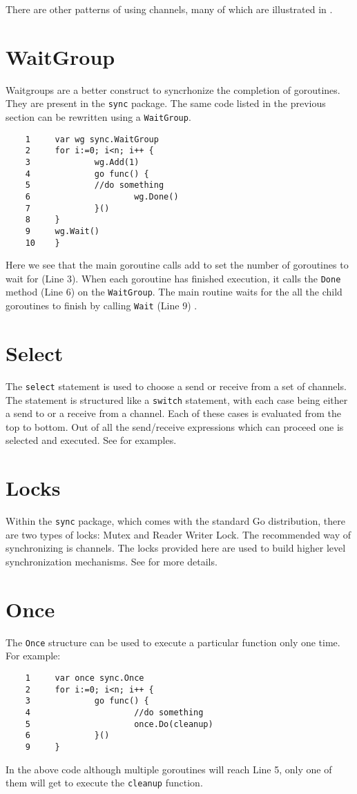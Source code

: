 \documentclass[8pt, twocolumn]{article}
\begin{document}
There are other patterns of using channels, many of
which are illustrated in \cite{effectivego}.
\section{WaitGroup}
Waitgroups are a better construct to syncrhonize the completion of
goroutines. They are present in the \verb=sync= package. The same code
listed in the previous section can be rewritten using a
\verb=WaitGroup=. 
\begin{verbatim}
    1     var wg sync.WaitGroup
    2     for i:=0; i<n; i++ {
    3             wg.Add(1)
    4             go func() {
    5             //do something
    6                     wg.Done()
    7             }()
    8     }
    9     wg.Wait()
    10    } 
\end{verbatim}
Here we see that the main goroutine calls add to set the number of
goroutines to wait for (Line 3). When each goroutine has finished
execution, it calls the \verb=Done= method (Line 6) on the
\verb=WaitGroup=. The main routine waits for the all the child
goroutines to finish by calling \verb=Wait= (Line 9) \cite{sync}.

\section{Select}
The \verb=select= statement is used to choose a send or receive from a
set of channels. The statement is structured like a \verb=switch=
statement, with each case being either a send to or a receive from a
channel. Each of these cases is evaluated from the top to bottom. Out
of all the send/receive expressions which can proceed one is selected
and executed. See \cite{golangspec} for examples.
\section{Locks}
Within the \verb=sync= package, which comes with the standard Go
distribution, there are two types of locks: Mutex and Reader Writer
Lock. The recommended way of synchronizing is channels. The locks
provided here are used to build higher level synchronization
mechanisms. See \cite{sync} for more details.
\section{Once}
The \verb=Once= structure can be used to execute a particular function
only one time. For example:
\begin{verbatim}
    1     var once sync.Once
    2     for i:=0; i<n; i++ {
    3             go func() {
    4                     //do something
    5                     once.Do(cleanup)
    6             }()
    9     }
\end{verbatim}
In the above code although multiple goroutines will reach Line 5, only
one of them will get to execute the \verb=cleanup= function.
\end{document}
